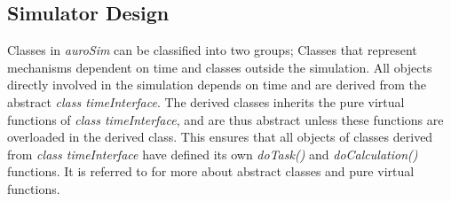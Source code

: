 % 
% 
 
 

		\subsection{Simulator Design} 	%
			Classes in \emph{auroSim} can be classified into two groups; Classes that represent mechanisms dependent on time and classes outside the simulation.
			All objects directly involved in the simulation depends on time and are derived from the abstract \emph{class timeInterface}. %
			The derived classes inherits the pure virtual functions of \emph{class timeInterface}, and are thus abstract unless these functions are overloaded in the derived class.
			This ensures that all objects of classes derived from \emph{class timeInterface} have defined its own \emph{doTask()} and \emph{doCalculation()} functions.
			It is referred to \cite{Stroustrup2000KAP12} for more about abstract classes and pure virtual functions. 



